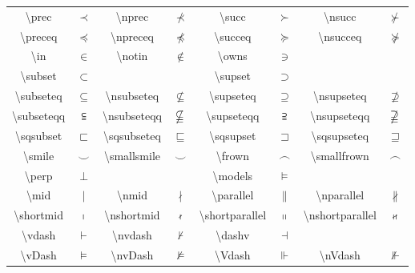 \begin{tabular}{cc|cc|cc|cc}
    \textbackslash\textsf{prec} & $\prec$ & \textbackslash\textsf{nprec} & $\nprec$ & \textbackslash\textsf{succ} & $\succ$ & \textbackslash\textsf{nsucc} & $\nsucc$ \\ 
    \textbackslash\textsf{preceq} & $\preceq$ & \textbackslash\textsf{npreceq} & $\npreceq$  & \textbackslash\textsf{succeq} & $\succeq$ & \textbackslash\textsf{nsucceq} & $\nsucceq$ \\
    \textbackslash\textsf{in} & $\in$ & \textbackslash\textsf{notin} & $\notin$ & \textbackslash\textsf{owns} & $\owns$ &  &  \\ 
    \textbackslash\textsf{subset} & $\subset$ &  &  & \textbackslash\textsf{supset} & $\supset$ &  &  \\ 
    \textbackslash\textsf{subseteq} & $\subseteq$ & \textbackslash\textsf{nsubseteq}  & $\nsubseteq$ & \textbackslash\textsf{supseteq} & $\supseteq$ & \textbackslash\textsf{nsupseteq} & $\nsupseteq$ \\ 
    \textbackslash\textsf{subseteqq}  & $\subseteqq$ & \textbackslash\textsf{nsubseteqq}  & $\nsubseteqq$ & \textbackslash\textsf{supseteqq}  & $\supseteqq$ & \textbackslash\textsf{nsupseteqq} & $\nsupseteqq$ \\ 
    \textbackslash\textsf{sqsubset} & $\sqsubset$ & \textbackslash\textsf{sqsubseteq} & $\sqsubseteq$ & \textbackslash\textsf{sqsupset} & $\sqsupset$ & \textbackslash\textsf{sqsupseteq} & $\sqsupseteq$  \\ 
    \textbackslash\textsf{smile} & $\smile$ & \textbackslash\textsf{smallsmile} & $\smallsmile$ & \textbackslash\textsf{frown} & $\frown$ & \textbackslash\textsf{smallfrown} & $\smallfrown$ \\ 
    \textbackslash\textsf{perp} & $\perp$ &  &  & \textbackslash\textsf{models} & $\models$ &  &  \\ 
    \textbackslash\textsf{mid} & $\mid$ & \textbackslash\textsf{nmid} & $\nmid$ & \textbackslash\textsf{parallel} & $\parallel$ & \textbackslash\textsf{nparallel} & $\nparallel$ \\ 
    \textbackslash\textsf{shortmid} & $\shortmid$ & \textbackslash\textsf{nshortmid} & $\nshortmid$ & \textbackslash\textsf{shortparallel} & $\shortparallel$ & \textbackslash\textsf{nshortparallel} & $\nshortparallel$ \\ 
    \textbackslash\textsf{vdash} & $\vdash$ & \textbackslash\textsf{nvdash} & $\nvdash$ & \textbackslash\textsf{dashv} & $\dashv$ &  &  \\ 
    \textbackslash\textsf{vDash}  & $\vDash$ & \textbackslash\textsf{nvDash}  & $\nvDash$ & \textbackslash\textsf{Vdash}  & $\Vdash $ & \textbackslash\textsf{nVdash} & $\nVdash$ \\ 

\end{tabular}
